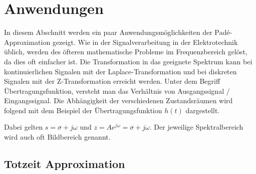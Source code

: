 %
%
%
\section{Anwendungen
\label{pade:section:Anwendungen}}

In diesem Abschnitt werden ein paar Anwendungsmöglichkeiten der Padé-Approximation gezeigt.
Wie in der Signalverarbeitung in der Elektrotechnik üblich, werden des öfteren mathematische Probleme im Frequenzbereich gelöst, da dies oft einfacher ist. 
Die Transformation in das geeignete Spektrum kann bei kontinuierlichen Signalen mit der Laplace-Transformation und bei diskreten Signalen mit der Z-Transformation erreicht werden.
Unter dem Begriff Übertragungsfunktion, versteht man das Verhältnis von Ausgangssignal / Eingangssignal.
Die Abhängigkeit der verschiedenen Zustandsräumen wird folgend mit dem Beispiel der Übertragungsfunktion $h(t)$ dargestellt.
\begin{center}
	\tikzset{>=latex}
\end{center}
Dabei gelten $s= \sigma+ j\omega$ und $z = A e^{j\omega} =\sigma+ j\omega$.
Der jeweilige Spektralbereich wird auch oft Bildbereich genannt.

\subsection{Totzeit Approximation
\label{pade:subsection:totzeit}}

